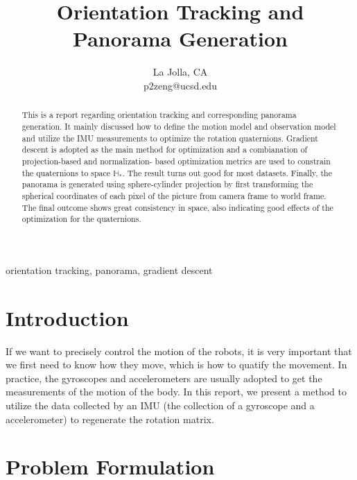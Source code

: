 \documentclass[conference]{IEEEtran}
\begin{document}
\title{Orientation Tracking and Panorama Generation\\

}

\author{
    La Jolla, CA \\
    p2zeng@ucsd.edu}


\maketitle

\begin{abstract}
    This is a report regarding orientation tracking and corresponding panorama generation. It mainly discussed how to
    define the motion model and observation model and utilize the IMU measurements to optimize the rotation quaternions.
    Gradient descent is adopted as the main method for optimization and a combianation of projection-based and normalization-
    based optimization metrics are used to constrain the quaternions to space $\mathbb{H}_*$. The result turns out good for
    most datasets. Finally, the panorama is
    generated using sphere-cylinder projection by first transforming the spherical coordinates of each pixel of the picture from
    camera frame to world frame. The final outcome shows great consistency in space, also indicating good effects of the optimization
    for the quaternions.
\end{abstract}

\begin{IEEEkeywords}
    orientation tracking, panorama, gradient descent
\end{IEEEkeywords}

\section{Introduction}

If we want to precisely control the motion of the robots, it is very important that we first need to know how they move, which is
how to quatify the movement. In practice, the gyroscopes and accelerometers are usually adopted to get the measurements of the
motion of the body. In this report, we present a method to utilize the data collected by an IMU (the collection of a gyroscope and
a accelerometer) to regenerate the rotation matrix.


\section{Problem Formulation}
\end{document}
